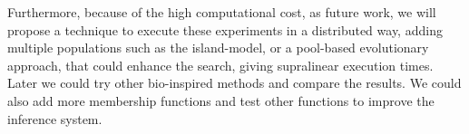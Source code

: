 \documentclass[symmetry,article,submit,moreauthors,pdftex]{Definitions/mdpi}
\begin{document}
\begin{paracol}{2}


Furthermore, because of the high computational cost, as future work, we will
propose a technique to execute these experiments in a distributed way, adding
multiple populations such as the island-model, or a pool-based evolutionary
approach, that could enhance the search, giving supralinear execution times.
Later we could try other bio-inspired methods and compare the results. We could
also add more membership functions and test other functions to improve the
inference system.




%
%
\vspace{6pt} 





\end{paracol}
\end{document}
